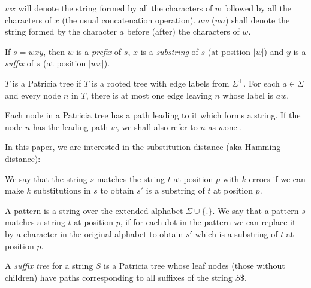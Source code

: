 \begin{definition}
$wx$ will denote the string formed by all the characters of $w$ followed by all the characters of $x$ (the usual concatenation operation). $aw$ ($wa$) shall denote the string formed by the character $a$ before (after) the characters of $w$.

If $s = wxy$, then $w$ is a \emph{prefix} of $s$, $x$ is a \emph{substring} of $s$ (at position $|w|$) and $y$ is a \emph{suffix} of $s$ (at position $|wx|$).
\end{definition}

\begin{definition}
$T$ is a Patricia tree if $T$ is a rooted tree with edge labels from $\Sigma^+$. For each $a \in \Sigma$ and every node $n$ in $T$, there is at most one edge leaving $n$ whose label is $aw$.

Each node in a Patricia tree has a path leading to it which forms a string. If the node $n$ has the leading path $w$, we shall also refer to $n$ as $\overline{w}$one .
\end{definition}

%

In this paper, we are interested in the substitution distance (aka Hamming distance):

\begin{definition}
We say that the string $s$ matches the string $t$ at position $p$ with $k$ errors if we can make $k$ substitutions in $s$ to obtain $s'$ is a substring of $t$ at position $p$.
\end{definition}

\begin{definition}[Pattern]
A pattern is a string over the extended alphabet $\Sigma\cup\{.\}$. We say that a pattern $s$ matches a string $t$ at position $p$, if for each dot in the pattern we can replace it by a character in the original alphabet to obtain $s'$ which is a substring of $t$ at position $p$.
\end{definition}

\begin{definition}
A \emph{suffix tree} for a string $S$ is a Patricia tree whose leaf nodes (those without children) have paths corresponding to all suffixes of the string $S\$ $.
\end{definition}

